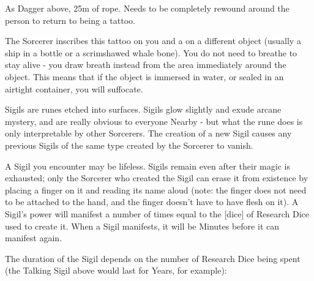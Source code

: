 {

As Dagger above, 25m of rope. Needs to be completely rewound around the person to return to being a tattoo.



The Sorcerer inscribes this tattoo on you and a  on a different object (usually a ship in a bottle or a scrimshawed whale bone).  You do not need to breathe to stay alive - you draw breath instead from the area immediately around the object.  This means that if the object is immersed in water, or sealed in an airtight container, you will suffocate.




Sigils are runes etched into surfaces.  Sigils glow slightly and exude arcane mystery, and are really obvious to everyone Nearby - but what the rune does is only interpretable by other Sorcerers.  The creation of a new Sigil causes any previous Sigils of the same type created by the Sorcerer to vanish.

A Sigil you encounter may be lifeless.  Sigils remain even after their magic is exhausted; only the Sorcerer who created the Sigil can erase it from existence by placing a finger on it and reading its name aloud (note: the finger does not need to be attached to the hand, and the finger doesn't have to have flesh on it).  A Sigil's power will manifest a number of times equal to the [dice] of Research Dice used to create it.  When a Sigil manifests, it will be Minutes before it can manifest again.


The duration of the Sigil depends on the number of Research Dice being spent (the Talking Sigil above would last for Years, for example):


}
